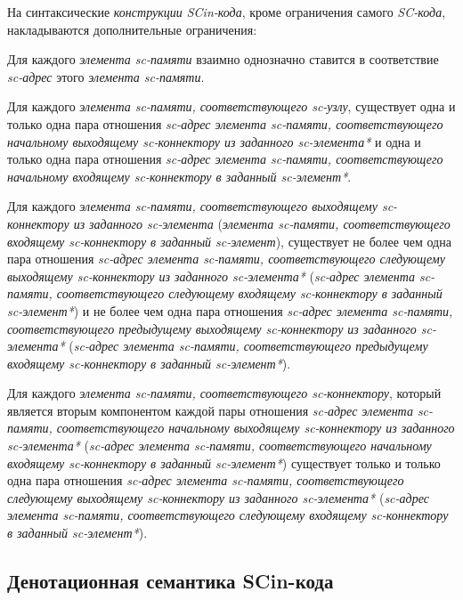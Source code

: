 На синтаксические \textit{конструкции SCin-кода}, кроме ограничения самого \textit{SC-кода}, накладываются дополнительные ограничения:
\begin{textitemize}
    \item Для каждого \textit{элемента sc-памяти} взаимно однозначно ставится в соответствие \textit{sc-адрес} этого \textit{элемента sc-памяти}.
    \item Для каждого \textit{элемента sc-памяти, соответствующего sc-узлу}, существует одна и только одна пара отношения \textit{sc-адрес элемента sc-памяти, соответствующего начальному выходящему sc-коннектору из заданного sc-элемента*} и одна и только одна пара отношения \textit{sc-адрес элемента sc-памяти, соответствующего начальному входящему sc-коннектору в заданный sc-элемент*}.
    \item Для каждого \textit{элемента sc-памяти, соответствующего выходящему sc-коннектору из заданного sc-элемента} (\textit{элемента sc-памяти, соответствующего входящему sc-коннектору в заданный sc-элемент}), существует не более чем одна пара отношения \textit{sc-адрес элемента sc-памяти, соответствующего следующему выходящему sc-коннектору из заданного sc-элемента*} (\textit{sc-адрес элемента sc-памяти, соответствующего следующему входящему sc-коннектору в заданный sc-элемент*}) и не более чем одна пара отношения \textit{sc-адрес элемента sc-памяти, соответствующего предыдущему выходящему sc-коннектору из заданного sc-элемента*} (\textit{sc-адрес элемента sc-памяти, соответствующего предыдущему входящему sc-коннектору в заданный sc-элемент*}).
    \item Для каждого \textit{элемента sc-памяти, соответствующего sc-коннектору}, который является вторым компонентом каждой пары отношения \textit{sc-адрес элемента sc-памяти, соответствующего начальному выходящему sc-коннектору из заданного sc-элемента*} (\textit{sc-адрес элемента sc-памяти, соответствующего начальному входящему sc-коннектору в заданный sc-элемент*}) существует только и только одна пара отношения \textit{sc-адрес элемента sc-памяти, соответствующего следующему выходящему sc-коннектору из заданного sc-элемента*} (\textit{sc-адрес элемента sc-памяти, соответствующего следующему входящему sc-коннектору в заданный sc-элемент*}).
\end{textitemize}

\subsection{Денотационная семантика SCin-кода}
\label{sec_soft_platform_scin_code_semantic}

